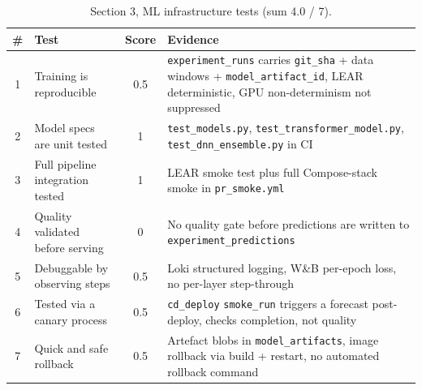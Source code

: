 \begin{table}[h]
  \centering
  \footnotesize
  \caption{Section 3, ML infrastructure tests (sum 4.0 / 7).}
  \renewcommand{\arraystretch}{1.3}
  \begin{tabularx}{\linewidth}{@{}c >{\raggedright\arraybackslash}p{3.9cm} c >{\raggedright\arraybackslash}X@{}}
    \toprule
    \textbf{\#} & \textbf{Test} & \textbf{Score} & \textbf{Evidence} \\
    \midrule
    1 & Training is reproducible & 0.5 & \texttt{experiment\_runs} carries \texttt{git\_sha} + data windows + \texttt{model\_artifact\_id}, LEAR deterministic, GPU non-determinism not suppressed \\
    2 & Model specs are unit tested & 1 & \texttt{test\_models.py}, \texttt{test\_transformer\_model.py}, \texttt{test\_dnn\_ensemble.py} in CI \\
    3 & Full pipeline integration tested & 1 & LEAR smoke test plus full Compose-stack smoke in \texttt{pr\_smoke.yml} \\
    4 & Quality validated before serving & 0 & No quality gate before predictions are written to \texttt{experiment\_predictions} \\
    5 & Debuggable by observing steps & 0.5 & Loki structured logging, W\&B per-epoch loss, no per-layer step-through \\
    6 & Tested via a canary process & 0.5 & \texttt{cd\_deploy} \texttt{smoke\_run} triggers a forecast post-deploy, checks completion, not quality \\
    7 & Quick and safe rollback & 0.5 & Artefact blobs in \texttt{model\_artifacts}, image rollback via build + restart, no automated rollback command \\
    \bottomrule
  \end{tabularx}
\end{table}

